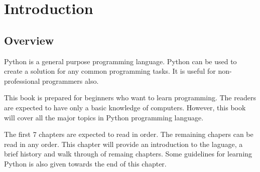 \cleardoublepage
{}
{}
\chapter*{Introduction}
\section{Overview}
Python is a general purpose programming language.  Python can be used
to create a solution for any common programming tasks.  It is useful
for non-professional programmers also.

This book is prepared for beginners who want to learn programming.
The readers are expected to have only a basic knowledge of computers.
However, this book will cover all the major topics in Python
programming language.

The first 7 chapters are expected to read in order.  The remaining
chapers can be read in any order. This chapter will provide an
introduction to the laguage, a brief history and walk through of
remaing chapters.  Some guidelines for learning Python is also given
towards the end of this chapter.
